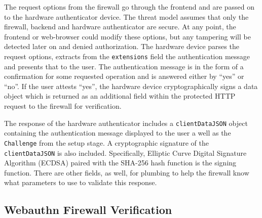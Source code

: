 The request options from the firewall go through the frontend and are passed on to the hardware authenticator device. The threat model assumes that only the firewall, backend and hardware authenticator are secure. At any point, the frontend or web-browser could modify these options, but any tampering will be detected later on and denied authorization. The hardware device parses the request options, extracts from the \lstinline{extensions} field the authentication message and presents that to the user. The authentication message is in the form of a confirmation for some requested operation and is answered either by ``yes'' or ``no''. If the user attests ``yes'', the hardware device cryptographically signs a data object which is returned as an additional field within the protected HTTP request to the firewall for verification.

The response of the hardware authenticator includes a \lstinline{clientDataJSON} object containing the authentication message displayed to the user a well as the \lstinline{Challenge} from the setup stage. A cryptographic signature of the \lstinline{clientDataJSON} is also included. Specifically, Elliptic Curve Digital Signature Algorithm (ECDSA) paired with the SHA-256 hash function is the signing function. There are other fields, as well, for plumbing to help the firewall know what parameters to use to validate this response.

\iffalse
\begin{lstlisting}
const credential: PublicKeyCredential = {
    id: string, // base64 encoded
    rawId: []bytes,
    response: {
        attestationObject: []bytes,
        clientDataJSON: {
            challenge: string, // base64 encoded
            clientExtensions: []bytes,
            hashAlgorithm: string,
            origin: string,
        },
    },
    type: 'public-key',
};
\end{lstlisting}

The \lstinline{clientDataJSON} contains the \lstinline{clientExtensions} which is the data displayed to the user as well as the \lstinline{challenge} from the setup stage. The cryptographic signature of the \lstinline{clientDataJSON} is included in the \lstinline{attestationObject} and uses the Elliptic Curve Digital Signature Algorithm (ECDSA) paired with the SHA-256 hash function. The other fields are for plumbing and help the firewall know what parameters to use to validate this authentication data object.
\fi

\subsection{Webauthn Firewall Verification}\label{Sec:WebauthnFirewallVerification}

